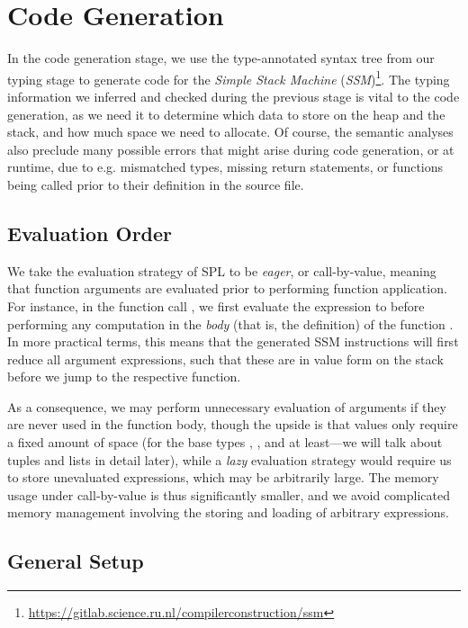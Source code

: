 \chapter{Code Generation}

In the code generation stage, we use the type-annotated syntax tree from our
typing stage to generate code for the \emph{Simple Stack Machine}
(\emph{SSM})\footnote{\url{https://gitlab.science.ru.nl/compilerconstruction/ssm}}.
The typing information we inferred and checked during the previous stage is
vital to the code generation, as we need it to determine which data to store on
the heap and the stack, and how much space we need to allocate.
Of course, the semantic analyses also preclude many possible errors that might
arise during code generation, or at runtime, due to e.g. mismatched types,
missing return statements, or functions being called prior to their definition
in the source file.


\section{Evaluation Order}

We take the evaluation strategy of SPL to be \emph{eager}, or call-by-value,
meaning that function arguments are evaluated prior to performing function
application. For instance, in the function call , we first evaluate
the expression  to  before performing any computation in the
\emph{body} (that is, the definition) of the function .
In more practical terms, this means that the generated SSM instructions will
first reduce all argument expressions, such that these are in value form on the
stack before we jump to the respective function.

As a consequence, we may perform unnecessary evaluation of arguments if they are
never used in the function body, though the upside is that values only require
a fixed amount of space (for the base types , , and
 at least---we will talk about tuples and lists in detail later),
while a \emph{lazy} evaluation strategy would require us to store unevaluated
expressions, which may be arbitrarily large.
The memory usage under call-by-value is thus significantly smaller, and we avoid
complicated memory management involving the storing and loading of arbitrary
expressions.


\section{General Setup}

